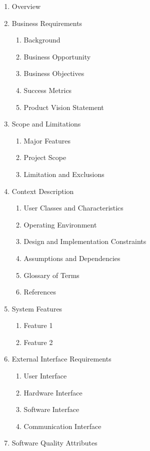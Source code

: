 \documentclass[
]{article}
\begin{document}
\begin{enumerate}
\def\labelenumi{\arabic{enumi}.}
\item
  Overview
\item
  Business Requirements

  \begin{enumerate}
  \def\labelenumii{\alph{enumii}.}
  \item
    Background
  \item
    Business Opportunity
  \item
    Business Objectives
  \item
    Success Metrics
  \item
    Product Vision Statement
  \end{enumerate}
\item
  Scope and Limitations

  \begin{enumerate}
  \def\labelenumii{\alph{enumii}.}
  \item
    Major Features
  \item
    Project Scope
  \item
    Limitation and Exclusions
  \end{enumerate}
\item
  Context Description

  \begin{enumerate}
  \def\labelenumii{\alph{enumii}.}
  \item
    User Classes and Characteristics
  \item
    Operating Environment
  \item
    Design and Implementation Constraints
  \item
    Assumptions and Dependencies
  \item
    Glossary of Terms
  \item
    References
  \end{enumerate}
\item
  System Features

  \begin{enumerate}
  \def\labelenumii{\alph{enumii}.}
  \item
    Feature 1
  \item
    Feature 2
  \end{enumerate}
\item
  External Interface Requirements

  \begin{enumerate}
  \def\labelenumii{\alph{enumii}.}
  \item
    User Interface
  \item
    Hardware Interface
  \item
    Software Interface
  \item
    Communication Interface
  \end{enumerate}
\item
  Software Quality Attributes


\end{enumerate}
\end{document}
